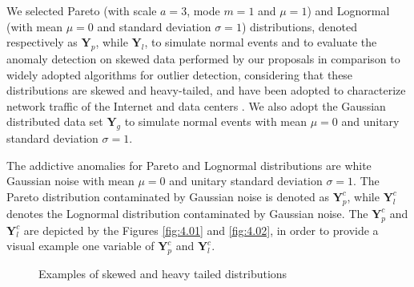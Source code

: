 We selected Pareto (with scale $a=3$, mode $m=1$ and $\mu=1$) and Lognormal (with mean $\mu=0$ and standard deviation $\sigma=1$) distributions, denoted respectively as $\pmb{Y}_p$, while $\pmb{Y}_l$, to simulate normal events and to evaluate the anomaly detection on skewed data performed by our proposals in comparison to widely adopted algorithms for outlier detection, considering that these distributions are skewed and heavy-tailed, and have been adopted to characterize network traffic of the Internet and data centers \cite{benson2010network,leon2017probability}. We also adopt the Gaussian distributed data set $\pmb{Y}_g$ to simulate normal events with mean $\mu=0$ and unitary standard deviation $\sigma=1$.

The addictive anomalies for Pareto and Lognormal distributions are white Gaussian noise with mean $\mu=0$ and unitary standard deviation $\sigma=1$. The Pareto distribution contaminated by Gaussian noise is denoted as $\pmb{Y}_p^c$, while $\pmb{Y}_l^c$ denotes the Lognormal distribution contaminated by Gaussian noise. The $\pmb{Y}_p^c$ and $\pmb{Y}_l^c$ are depicted by the Figures \ref{fig:4.01} and \ref{fig:4.02}, in order to provide a visual example one variable of $\pmb{Y}_p^c$ and $\pmb{Y}_l^c$.

\begin{figure}[!htb]
	\centering
	\caption[Examples of skewed and heavy tailed distributions]{Examples of skewed and heavy tailed distributions}
	\label{fig:4.03}
\end{figure}

